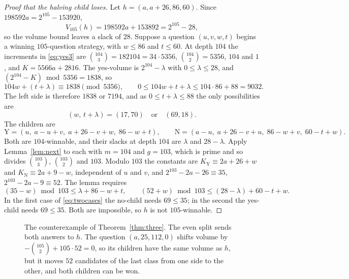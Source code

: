 \documentclass[11pt]{amsart}
\theoremstyle{definition}
\newcommand{\Y}{\mathrm{Y}}
\newcommand{\N}{\mathrm{N}}
\begin{document}
\begin{proof}[Proof that the halving child loses]
Let $h=(a,a+26,86,60)$. Since $198592a=2^{105}-153920$,
\[
V_{105}(h)=198592a+153892=2^{105}-28 ,
\]
so the volume bound leaves a slack of $28$. Suppose a question $(u,v,w,t)$ begins a winning $105$-question
strategy, with $w\le86$ and $t\le60$. At depth $104$ the increments in \eqref{eq:yes3} are
$\binom{104}3=182104=34\cdot5356$, $\binom{104}2=5356$, $104$ and $1$, and $K=5566a+2816$. The yes-volume is
$2^{104}-\lambda$ with $0\le\lambda\le28$, and $(2^{104}-K)\bmod5356=1838$, so
\[
104w+(t+\lambda)\equiv1838\pmod{5356},\qquad 0\le104w+t+\lambda\le104\cdot86+88=9032 .
\]
The left side is therefore $1838$ or $7194$, and as $0\le t+\lambda\le88$ the only possibilities are
\begin{equation}\label{eq:twocases}
(w,\,t+\lambda)=(17,70)\quad\text{or}\quad(69,18).
\end{equation}
The children are
\[
\Y=(u,\;a-u+v,\;a+26-v+w,\;86-w+t),\qquad\N=(a-u,\;a+26-v+u,\;86-w+v,\;60-t+w).
\]
Both are $104$-winnable, and their slacks at depth $104$ are $\lambda$ and $28-\lambda$. Apply Lemma~\ref{lem:next} to each with $m=104$ and $g=103$,
which is prime and so divides $\binom{103}3$, $\binom{103}2$ and $103$. Modulo $103$ the constants are
$K_\Y\equiv2a+26+w$ and $K_\N\equiv2a+9-w$, independent of $u$ and $v$, and $2^{103}-2a-26\equiv35$,
$2^{103}-2a-9\equiv52$. The lemma requires
\[
(35-w)\bmod103\le\lambda+86-w+t,\qquad(52+w)\bmod103\le(28-\lambda)+60-t+w .
\]
In the first case of \eqref{eq:twocases} the no-child needs $69\le35$; in the second the yes-child needs $69\le35$.
Both are impossible, so $h$ is not $105$-winnable.
\end{proof}

\begin{figure}[t]
\centering
{}
\caption{The counterexample of Theorem~\ref{thm:three}. The even split sends both answers to $h$. The question
$(a,25,112,0)$ shifts volume by $-\binom{105}2+105\cdot52=0$, so its children have the same volume as $h$, but it
moves $52$ candidates of the last class from one side to the other, and both children can be won.}\label{fig:three}
\end{figure}
\end{document}
